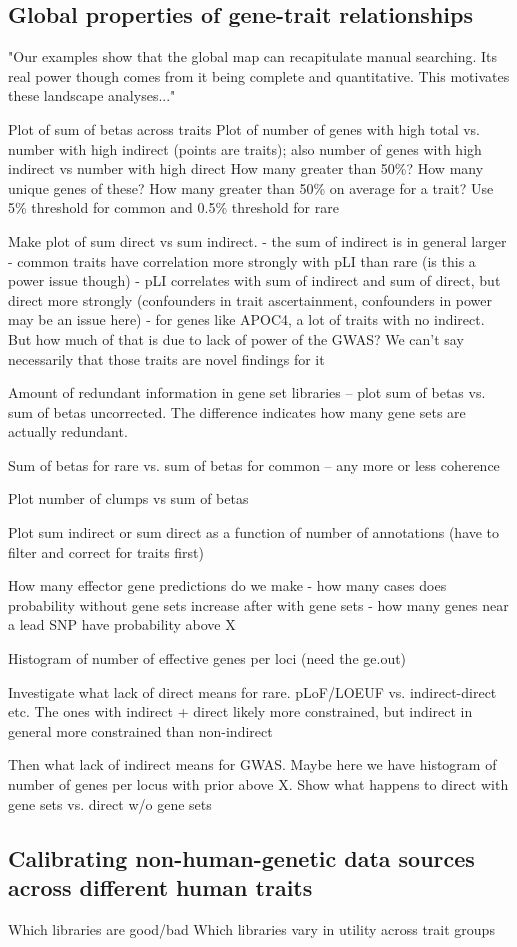 \subsection{Global properties of gene-trait relationships}

"Our examples show that the global map can recapitulate manual searching. Its real power though comes from it being complete and quantitative. This motivates these landscape analyses..."

Plot of sum of betas across traits
Plot of number of genes with high total vs. number with high indirect (points are traits); also number of genes with high indirect vs number with high direct
How many greater than 50\%? How many unique genes of these?
How many greater than 50\% on average for a trait? Use 5\% threshold for common and 0.5\% threshold for rare

Make plot of sum direct vs sum indirect.
 - the sum of indirect is in general larger
 - common traits have correlation more strongly with pLI than rare (is this a power issue though)
 - pLI correlates with sum of indirect and sum of direct, but direct more strongly (confounders in trait ascertainment, confounders in power may be an issue here)
  - for genes like APOC4, a lot of traits with no indirect. But how much of that is due to lack of power of the GWAS? We can't say necessarily that those traits are novel findings for it


Amount of redundant information in gene set libraries -- plot sum of betas vs. sum of betas uncorrected. The difference indicates how many gene sets are actually redundant.

Sum of betas for rare vs. sum of betas for common -- any more or less coherence 

Plot number of clumps vs sum of betas

Plot sum indirect or sum direct as a function of number of annotations (have to filter and correct for traits first)

How many effector gene predictions do we make
 - how many cases does probability without gene sets increase after with gene sets
 - how many genes near a lead SNP have probability above X

 Histogram of number of effective genes per loci (need the ge.out)

Investigate what lack of direct means for rare. pLoF/LOEUF vs. indirect-direct etc. The ones with indirect + direct likely more constrained, but indirect in general more constrained than non-indirect

Then what lack of indirect means for GWAS. Maybe here we have histogram of number of genes per locus with prior above X. Show what happens to direct with gene sets vs. direct w/o gene sets

\subsection{Calibrating non-human-genetic data sources across different human traits}

Which libraries are good/bad
Which libraries vary in utility across trait groups